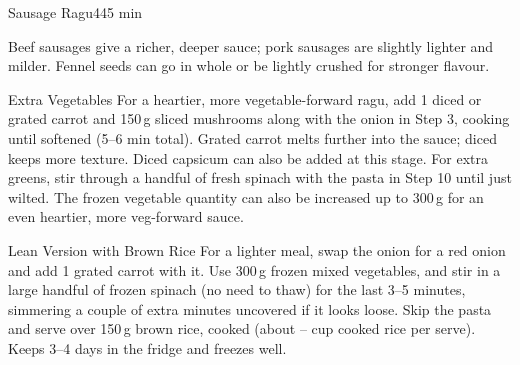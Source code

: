 \begin{recipebox}{Sausage Ragu}{4}{45 min}
\begin{notes}
Beef sausages give a richer, deeper sauce; pork sausages are slightly lighter and milder. Fennel seeds can go in whole or be lightly crushed for stronger flavour.
\end{notes}

\begin{variationbox}{Extra Vegetables}
For a heartier, more vegetable-forward ragu, add 1 diced or grated carrot and 150\,g sliced mushrooms along with the onion in Step 3, cooking until softened (5--6 min total). Grated carrot melts further into the sauce; diced keeps more texture. Diced capsicum can also be added at this stage. For extra greens, stir through a handful of fresh spinach with the pasta in Step 10 until just wilted. The frozen vegetable quantity can also be increased up to 300\,g for an even heartier, more veg-forward sauce.
\end{variationbox}

\begin{variationbox}{Lean Version with Brown Rice}
For a lighter meal, swap the onion for a red onion and add 1 grated carrot with
it. Use 300\,g frozen mixed vegetables, and stir in a large handful of frozen
spinach (no need to thaw) for the last 3--5 minutes, simmering a couple of
extra minutes uncovered if it looks loose. Skip the pasta and serve over
150\,g brown rice, cooked (about -- cup cooked
rice per serve). Keeps 3--4 days in the fridge and freezes well.
\end{variationbox}

\end{recipebox}